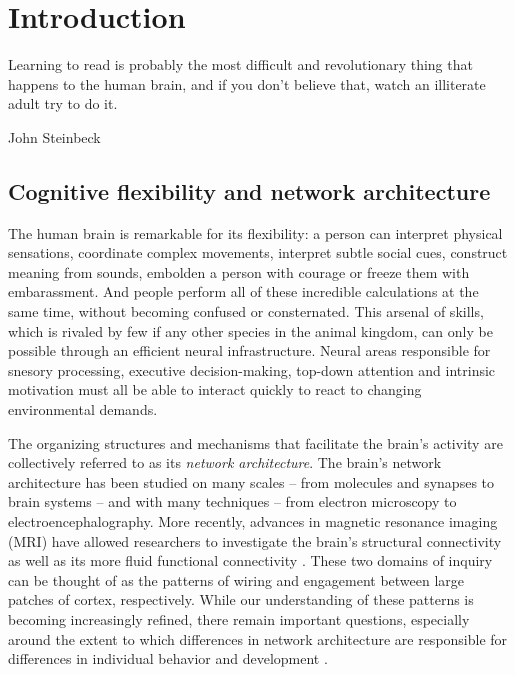 \chapter{Introduction}

\epigraph{Learning to read is probably the most difficult and revolutionary thing that happens to the human brain, and if you don't believe that, watch an illiterate adult try to do it.}{John Steinbeck}

\section{Cognitive flexibility and network architecture}

The human brain is remarkable for its flexibility: a person can interpret physical sensations, coordinate complex movements, interpret subtle social cues, construct meaning from sounds, embolden a person with courage or freeze them with embarassment. And people perform all of these incredible calculations at the same time, without becoming confused or consternated. This arsenal of skills, which is rivaled by few if any other species in the animal kingdom, can only be possible through an efficient neural infrastructure. Neural areas responsible for snesory processing, executive decision-making, top-down attention and intrinsic motivation must all be able to interact quickly to react to changing environmental demands. 

The organizing structures and mechanisms that facilitate the brain's activity are collectively referred to as its \textit{network architecture}. The brain's network architecture has been studied on many scales -- from molecules and synapses to brain systems -- and with many techniques -- from electron microscopy to electroencephalography. More recently, advances in magnetic resonance imaging (MRI) have allowed researchers to investigate the brain's structural connectivity as well as its more fluid functional connectivity \citep{Betzel2013}. These two domains of inquiry can be thought of as the patterns of wiring and engagement between large patches of cortex, respectively. While our understanding of these patterns is becoming increasingly refined, there remain important questions, especially around the extent to which differences in network architecture are responsible for differences in individual behavior and development \citep{Petersen2015}.

